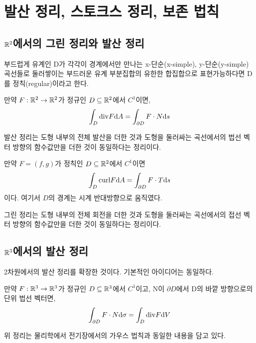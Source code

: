 \section{발산 정리, 스토크스 정리, 보존 법칙}
\subsection{$\mathbb{R}^2$에서의 그린 정리와 발산 정리}

\begin{definition}[정칙]
부드럽게 유계인 D가 각각이 경계에서만 만나는 x-단순(x-simple), y-단순(y-simple) 곡선들로 둘러쌓이는 부드러운 유계 부분집합의 유한한 합집합으로 표현가능하다면 D를 정칙(regular)이라고 한다.
\end{definition}

\begin{theorem}
만약 $F: \mathbb{R}^2 \to \mathbb{R}^2$가 정규인 $D\subseteq\mathbb{R}^2$에서 $C^1$이면,
$$
\int_D \mathrm{div} F\dd A = \int_{\partial D}F \cdot N\dd s
$$
\end{theorem}
발산 정리는 도형 내부의 전체 발산을 더한 것과 도형을 둘러싸는 곡선에서의 법선 벡터 방향의 함수값만을 더한 것이 동일하다는 정리이다.

\begin{theorem}
만약 $F=(f,g)$가 정칙인 $D\subseteq\mathbb{R}^2$에서 $C^1$이면
$$
\int_D \mathrm{curl} F\dd A = \int_{\partial D}F\cdot T\dd s
$$
이다. 여기서 $D$의 경계는 시계 반대방향으로 움직였다.
\end{theorem}
그린 정리는 도형 내부의 전체 회전을 더한 것과 도형을 둘러싸는 곡선에서의 접선 벡터 방향의 함수값만을 더한 것이 동일하다는 정리이다.

\subsection{$\mathbb{R}^3$에서의 발산 정리}
2차원에서의 발산 정리를 확장한 것이다. 기본적인 아이디어는 동일하다.
\begin{theorem}
만약 $F: \mathbb{R}^3 \to \mathbb{R}^3$가 정규인 $D\subseteq\mathbb{R}^3$에서 $C^1$이고, N이 $\partial D$에서 D의 바깥 방향으로의 단위 법선 벡터면,
$$
\int_{\partial D} F\cdot N\dd \sigma = \int_{D}\mathrm{div} F\dd V
$$
\end{theorem}
위 정리는 물리학에서 전기장에서의 가우스 법칙과 동일한 내용을 담고 있다.


